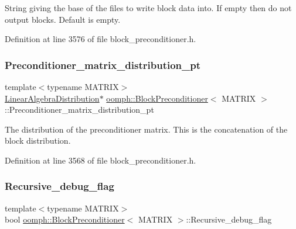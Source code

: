 String giving the base of the files to write block data into. If empty then do not output blocks. Default is empty. 



Definition at line 3576 of file block\+\_\+preconditioner.\+h.

\mbox{\label{classoomph_1_1BlockPreconditioner_ad647cfa61939e3c118dcc2595a7f9240}} 
\subsubsection{\texorpdfstring{Preconditioner\+\_\+matrix\+\_\+distribution\+\_\+pt}{Preconditioner\_matrix\_distribution\_pt}}
{\footnotesize\ttfamily template$<$typename M\+A\+T\+R\+IX$>$ \\
\hyperlink{classoomph_1_1LinearAlgebraDistribution}{Linear\+Algebra\+Distribution}$\ast$ \hyperlink{classoomph_1_1BlockPreconditioner}{oomph\+::\+Block\+Preconditioner}$<$ M\+A\+T\+R\+IX $>$\+::Preconditioner\+\_\+matrix\+\_\+distribution\+\_\+pt\hspace{0.3cm}{\ttfamily [private]}}



The distribution of the preconditioner matrix. This is the concatenation of the block distribution. 



Definition at line 3568 of file block\+\_\+preconditioner.\+h.

\mbox{\label{classoomph_1_1BlockPreconditioner_ae6ce543de76eedb34a2562eecceb222b}} 
\subsubsection{\texorpdfstring{Recursive\+\_\+debug\+\_\+flag}{Recursive\_debug\_flag}}
{\footnotesize\ttfamily template$<$typename M\+A\+T\+R\+IX$>$ \\
bool \hyperlink{classoomph_1_1BlockPreconditioner}{oomph\+::\+Block\+Preconditioner}$<$ M\+A\+T\+R\+IX $>$\+::Recursive\+\_\+debug\+\_\+flag\hspace{0.3cm}{\ttfamily [private]}}



